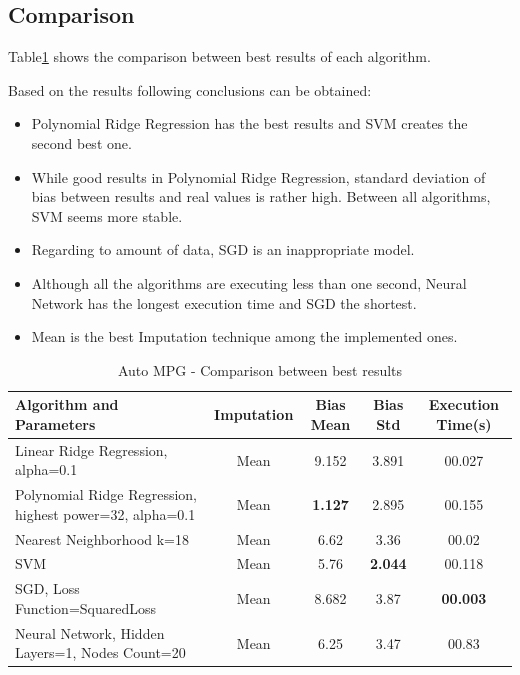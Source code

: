 \subsection{Comparison}
Table\ref{table:db1-results} shows the comparison between best results of each algorithm.

Based on the results following conclusions can be obtained:
\begin{itemize}
  \item Polynomial Ridge Regression has the best results and SVM creates the second best one.
  \item While good results in Polynomial Ridge Regression, standard deviation of bias between results and real values is rather high. Between all algorithms, SVM seems more stable.
  \item Regarding to amount of data, SGD is an inappropriate model.
  \item Although all the algorithms are executing less than one second, Neural Network has the longest execution time and SGD the shortest.
  \item Mean is the best Imputation technique among the implemented ones.
\end{itemize}

		\begin{table}
\begin{center}
\begin{tabular}{|p{4cm}|c|c|c|c|}
\hline Algorithm and Parameters & Imputation & Bias Mean & Bias Std & Execution Time(s)\\

\hline Linear Ridge Regression, alpha=0.1 & Mean & 9.152 & 3.891 & 00.027 \\

\hline Polynomial Ridge Regression, highest power=32, alpha=0.1 & Mean & \textbf{1.127} & 2.895 & 00.155  \\

\hline Nearest Neighborhood k=18 & Mean & 6.62 & 3.36 & 00.02  \\

\hline SVM & Mean & 5.76 & \textbf{2.044} & 00.118  \\

\hline SGD, Loss Function=SquaredLoss & Mean & 8.682 & 3.87 & \textbf{00.003}  \\

\hline Neural Network, Hidden Layers=1, Nodes Count=20 & Mean & 6.25 & 3.47 & 00.83  \\

\hline
\end{tabular}
    \caption{Auto MPG - Comparison between best results}
    \label{table:db1-results}
\end{center}
    \end{table}


